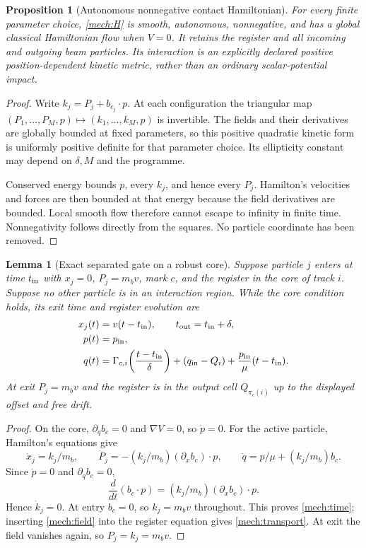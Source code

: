 \documentclass[11pt]{article}
\newtheorem{lemma}[theorem]{Lemma}
\newtheorem{proposition}[theorem]{Proposition}
\theoremstyle{definition}\newtheorem{definition}[theorem]{Definition}
\theoremstyle{remark}\newtheorem{remark}[theorem]{Remark}
\begin{document}
\begin{proposition}[Autonomous nonnegative contact Hamiltonian]
\label{mech:hamiltonian}
For every finite parameter choice, \eqref{mech:H} is smooth, autonomous,
nonnegative, and has a global classical Hamiltonian flow when $V=0$.
It retains the register and all incoming and outgoing beam particles.
Its interaction is an explicitly declared positive position-dependent kinetic
metric, rather than an ordinary scalar-potential impact.
\end{proposition}
\begin{proof}
Write $k_j=P_j+b_{c_j}\cdot p$. At each configuration the triangular map
$(P_1,\ldots,P_M,p)\mapsto(k_1,\ldots,k_M,p)$ is invertible.
The fields and their derivatives are globally bounded at fixed parameters,
so this positive quadratic kinetic form is uniformly positive definite for
that parameter choice. Its ellipticity constant may depend on $\delta,M$
and the programme.

Conserved energy bounds $p$, every $k_j$, and hence every $P_j$.
Hamilton's velocities and forces are then bounded at that energy because
the field derivatives are bounded. Local smooth flow therefore cannot
escape to infinity in finite time. Nonnegativity follows directly from the
squares. No particle coordinate has been removed.
\end{proof}

\begin{lemma}[Exact separated gate on a robust core]
\label{mech:exactgate}
Suppose particle $j$ enters at time $t_{\rm in}$ with $x_j=0$,
$P_j=m_bv$, mark $c$, and the register in the core of track $i$.
Suppose no other particle is in an interaction region.
While the core condition holds, its exit time and register evolution are
\begin{align}
 x_j(t)&=v(t-t_{\rm in}),\qquad
 t_{\rm out}=t_{\rm in}+\delta,\label{mech:time}\\
 p(t)&=p_{\rm in},\nonumber\\
 q(t)&=\Gamma_{c,i}\!\left(\frac{t-t_{\rm in}}{\delta}\right)
       +(q_{\rm in}-Q_i)
       +\frac{p_{\rm in}}{\mu}(t-t_{\rm in}).\label{mech:transport}
\end{align}
At exit $P_j=m_bv$ and the register is in the output cell
$Q_{\pi_c(i)}$ up to the displayed offset and free drift.
\end{lemma}
\begin{proof}
On the core, $\partial_qb_c=0$ and $\nabla V=0$, so $\dot p=0$.
For the active particle, Hamilton's equations give
\[
 \dot x_j=k_j/m_b,\qquad
 \dot P_j=-(k_j/m_b)(\partial_xb_c)\cdot p,\qquad
 \dot q=p/\mu+(k_j/m_b)b_c.
\]
Since $\dot p=0$ and $\partial_qb_c=0$,
\[
 \frac{d}{dt}(b_c\cdot p)
       =(k_j/m_b)(\partial_xb_c)\cdot p.
\]
Hence $\dot k_j=0$. At entry $b_c=0$, so $k_j=m_bv$ throughout.
This proves \eqref{mech:time}; inserting \eqref{mech:field} into the
register equation gives \eqref{mech:transport}.
At exit the field vanishes again, so $P_j=k_j=m_bv$.
\end{proof}
\end{document}
